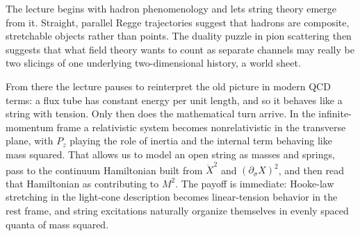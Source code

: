 The lecture begins with hadron phenomenology and lets string theory emerge from it. Straight, parallel Regge trajectories suggest that hadrons are composite, stretchable objects rather than points. The duality puzzle in pion scattering then suggests that what field theory wants to count as separate channels may really be two slicings of one underlying two-dimensional history, a world sheet.

From there the lecture pauses to reinterpret the old picture in modern QCD terms: a flux tube has constant energy per unit length, and so it behaves like a string with tension. Only then does the mathematical turn arrive. In the infinite-momentum frame a relativistic system becomes nonrelativistic in the transverse plane, with \(P_z\) playing the role of inertia and the internal term behaving like mass squared. That allows us to model an open string as masses and springs, pass to the continuum Hamiltonian built from \(\dot X^2\) and \((\partial_\sigma X)^2\), and then read that Hamiltonian as contributing to \(M^2\). The payoff is immediate: Hooke-law stretching in the light-cone description becomes linear-tension behavior in the rest frame, and string excitations naturally organize themselves in evenly spaced quanta of mass squared.
